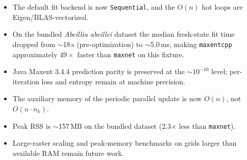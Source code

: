 \begin{itemize}[leftmargin=1.2em]
\item The default fit backend is now \texttt{Sequential}, and the
$O(n)$ hot loops are Eigen/BLAS-vectorized.
\item On the bundled \emph{Abeillia abeillei} dataset the median
fresh-state fit time dropped from $\sim$18\,s (pre-optimization) to
$\sim$5.0\,ms, making \texttt{maxentcpp} approximately $49\times$ faster
than \texttt{maxnet} on this fixture.
\item Java Maxent 3.4.4 prediction parity is preserved at the
$\sim 10^{-10}$ level; per-iteration loss and entropy remain at machine
precision.
\item The auxiliary memory of the periodic parallel update is now
$O(n)$, not $O(n \cdot n_h)$.
\item Peak RSS is $\sim$157\,MB on the bundled dataset (2.3$\times$
less than \texttt{maxnet}).
\item Large-raster scaling and peak-memory benchmarks on grids larger
than available RAM remain future work.
\end{itemize}
